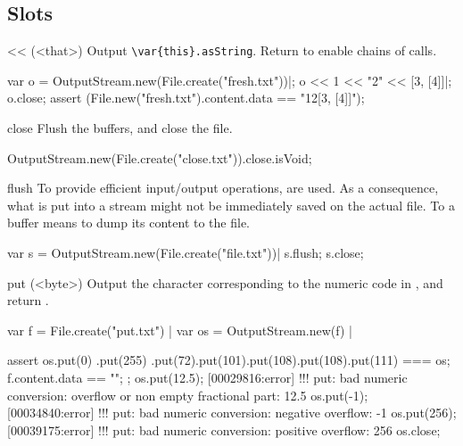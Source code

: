 \subsection{Slots}

\begin{urbiscriptapi}
\item[<<](<that>)%
  Output \lstinline|\var{this}.asString|.  Return \this to
  enable chains of calls.
\begin{urbiscript}
var o = OutputStream.new(File.create("fresh.txt"))|;
o << 1 << "2" << [3, [4]]|;
o.close;
assert (File.new("fresh.txt").content.data == "12[3, [4]]");
\end{urbiscript}

\item[close]
  Flush the buffers, and close the file.
\begin{urbiassert}
OutputStream.new(File.create("close.txt")).close.isVoid;
\end{urbiassert}

\item[flush]%
  To provide efficient input/output operations,  are
  used.  As a consequence, what is put into a stream might not be
  immediately saved on the actual file.  To  a buffer means to
  dump its content to the file.
\begin{urbiscript}
var s = OutputStream.new(File.create("file.txt"))|
s.flush;
s.close;
\end{urbiscript}

\item[put](<byte>)%
  Output the character corresponding to the numeric code  in
  \this, and return \this.
\begin{urbiscript}
var f = File.create("put.txt") |
var os = OutputStream.new(f) |

assert
{
  os.put(0)
    .put(255)
    .put(72).put(101).put(108).put(108).put(111)
  === os;
  f.content.data == "\0\xffHello";
};
os.put(12.5);
[00029816:error] !!! put: bad numeric conversion: overflow or non empty fractional part: 12.5
os.put(-1);
[00034840:error] !!! put: bad numeric conversion: negative overflow: -1
os.put(256);
[00039175:error] !!! put: bad numeric conversion: positive overflow: 256
os.close;
\end{urbiscript}

\end{urbiscriptapi}


